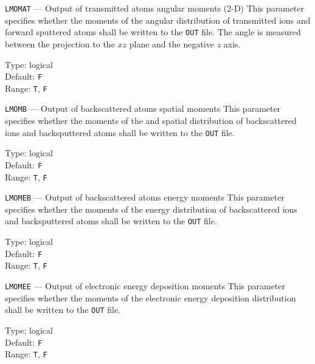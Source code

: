 \begin{keydescription}{\texttt{LMOMAT} --- Output of transmitted atoms angular
moments (2-D)}
%
  This parameter specifies whether the moments of the angular distribution 
  of transmitted ions and forward sputtered atoms shall be written to
  the \texttt{OUT} file. The angle is measured
  between the projection to the $xz$ plane and the negative $z$ axis.
  \begin{keytab}
    Type:    \> logical \\
    Default: \> \texttt{F} \\
    Range:   \> \texttt{T}, \texttt{F} 
  \end{keytab}
\end{keydescription}

\begin{keydescription}{\texttt{LMOMB} --- Output of backscattered atoms
spatial moments}
%
  This parameter specifies whether the moments of the and spatial distribution 
  of backscattered ions and backsputtered atoms shall be written to the \texttt{OUT} file.
  \begin{keytab}
    Type:    \> logical \\
    Default: \> \texttt{F} \\
    Range:   \> \texttt{T}, \texttt{F} 
  \end{keytab}
\end{keydescription}

\begin{keydescription}{\texttt{LMOMEB} --- Output of backscattered atoms
energy moments}
%
  This parameter specifies whether the moments of the energy distribution 
  of backscattered ions and backsputtered atoms shall be written to the
  \texttt{OUT} file. 
  \begin{keytab}
    Type:    \> logical \\
    Default: \> \texttt{F} \\
    Range:   \> \texttt{T}, \texttt{F} 
  \end{keytab}
\end{keydescription}

\begin{keydescription}{\texttt{LMOMEE} --- Output of electronic energy deposition moments}
%
  This parameter specifies whether the moments of the electronic energy
  deposition distribution shall be written to the \texttt{OUT} file.
  \begin{keytab}
    Type:    \> logical \\
    Default: \> \texttt{F} \\
    Range:   \> \texttt{T}, \texttt{F} 
  \end{keytab}
\end{keydescription}

